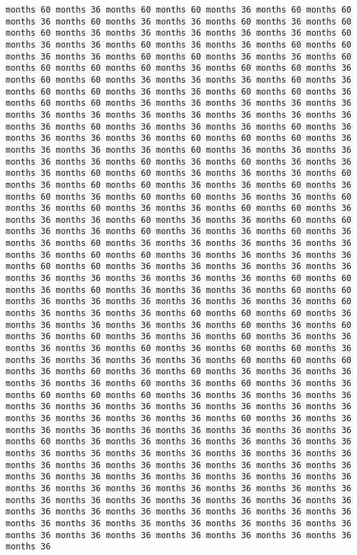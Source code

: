 \documentclass[11pt]{article}
\begin{document}
\begin{Verbatim}[commandchars=\\\{\}, frame=single, framerule=2mm, rulecolor=\color{outerrorbackground}]
months 60 months 36 months 60 months 60 months 36 months 60 months 60 months 36 months 60 months 36 months 36 months 60 months 36 months 60 months 60 months 36 months 36 months 36 months 36 months 36 months 60 months 36 months 36 months 60 months 36 months 36 months 60 months 60 months 36 months 36 months 60 months 60 months 36 months 36 months 60 months 60 months 60 months 60 months 36 months 60 months 60 months 36 months 60 months 60 months 36 months 36 months 36 months 60 months 36 months 60 months 60 months 36 months 36 months 60 months 60 months 36 months 60 months 60 months 36 months 36 months 36 months 36 months 36 months 36 months 36 months 36 months 36 months 36 months 36 months 36 months 36 months 60 months 36 months 36 months 36 months 60 months 36 months 36 months 36 months 36 months 60 months 60 months 60 months 36 months 36 months 36 months 36 months 60 months 36 months 36 months 36 months 36 months 36 months 60 months 36 months 60 months 36 months 36 months 36 months 60 months 60 months 36 months 36 months 36 months 60 months 36 months 60 months 60 months 36 months 36 months 60 months 36 months 60 months 36 months 60 months 60 months 36 months 36 months 60 months 36 months 60 months 36 months 36 months 60 months 60 months 36 months 36 months 36 months 60 months 36 months 36 months 60 months 60 months 36 months 36 months 60 months 36 months 36 months 60 months 36 months 36 months 60 months 36 months 36 months 36 months 36 months 36 months 36 months 60 months 60 months 36 months 36 months 36 months 36 months 60 months 60 months 36 months 36 months 36 months 36 months 36 months 36 months 36 months 36 months 36 months 36 months 60 months 60 months 36 months 60 months 36 months 36 months 36 months 60 months 60 months 36 months 36 months 36 months 36 months 36 months 36 months 60 months 36 months 36 months 36 months 60 months 60 months 60 months 36 months 36 months 36 months 36 months 36 months 60 months 36 months 60 months 36 months 60 months 36 months 36 months 60 months 36 months 36 months 36 months 36 months 60 months 36 months 60 months 60 months 36 months 36 months 36 months 36 months 36 months 60 months 60 months 60 months 36 months 60 months 36 months 60 months 36 months 36 months 36 months 36 months 36 months 60 months 36 months 60 months 36 months 36 months 60 months 60 months 60 months 36 months 36 months 36 months 36 months 36 months 36 months 36 months 36 months 36 months 36 months 36 months 36 months 36 months 36 months 36 months 60 months 36 months 36 months 36 months 36 months 36 months 36 months 36 months 36 months 36 months 60 months 36 months 36 months 36 months 36 months 36 months 36 months 36 months 36 months 36 months 36 months 36 months 36 months 36 months 36 months 36 months 36 months 36 months 36 months 36 months 36 months 36 months 36 months 36 months 36 months 36 months 36 months 36 months 36 months 36 months 36 months 36 months 36 months 36 months 36 months 36 months 36 months 36 months 36 months 36 months 36 months 36 months 36 months 36 months 36 months 36 months 36 months 36 months 36 months 36 months 36 months 36 months 36 months 36 months 36 months 36 months 36 months 36 months 36 months 36 months 36 months 36 months 36 months 36 
\end{Verbatim}
\end{document}
